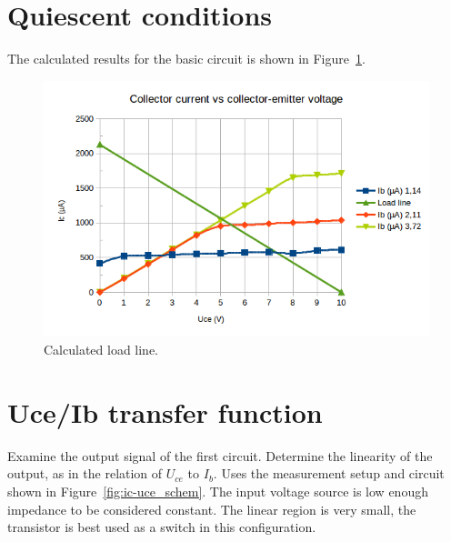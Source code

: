 \documentclass[11pt,a4paper]{article}
\begin{document}
\section{Quiescent conditions}\label{quiescent-conditions}
The calculated results for the basic circuit is shown in Figure~\ref{fig:load-line_plot}.

\begin{figure}[htbp]
    \centering
    \includegraphics[width=\textwidth]{img/load-line_plot}
    \caption{Calculated load line.}
    \label{fig:load-line_plot}
\end{figure}

\section{Uce/Ib transfer function}\label{uceib-transfer-function}

Examine the output signal of the first circuit. Determine the linearity
of the output, as in the relation of $U_{ce}$ to $I_{b}$. Uses the measurement
setup and circuit shown in Figure~\ref{fig:ic-uce_schem}. The input voltage source is low
enough impedance to be considered constant. The linear region is very
small, the transistor is best used as a switch in this configuration.
\end{document}
